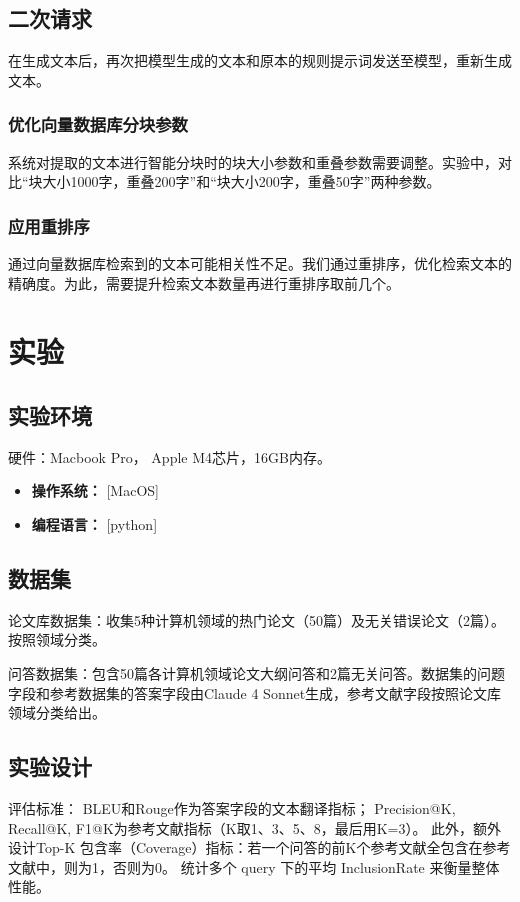 \documentclass[12pt,a4paper]{article}
\begin{document}
\subsection{二次请求}

在生成文本后，再次把模型生成的文本和原本的规则提示词发送至模型，重新生成文本。

\subsubsection{优化向量数据库分块参数}
系统对提取的文本进行智能分块时的块大小参数和重叠参数需要调整。实验中，对比“块大小1000字，重叠200字”和“块大小200字，重叠50字”两种参数。

\subsubsection{应用重排序}
通过向量数据库检索到的文本可能相关性不足。我们通过重排序，优化检索文本的精确度。为此，需要提升检索文本数量再进行重排序取前几个。

\section{实验}

\subsection{实验环境}
硬件：Macbook Pro， Apple M4芯片，16GB内存。

\begin{itemize}
    \item \textbf{操作系统：} [MacOS]
    \item \textbf{编程语言：} [python]
\end{itemize}

\subsection{数据集}
论文库数据集：收集5种计算机领域的热门论文（50篇）及无关错误论文（2篇）。按照领域分类。

问答数据集：包含50篇各计算机领域论文大纲问答和2篇无关问答。数据集的问题字段和参考数据集的答案字段由Claude 4 Sonnet生成，参考文献字段按照论文库领域分类给出。

\subsection{实验设计}

评估标准：
BLEU和Rouge作为答案字段的文本翻译指标；
Precision@K, Recall@K, F1@K为参考文献指标（K取1、3、5、8，最后用K=3）。
此外，额外设计Top-K 包含率（Coverage）指标：若一个问答的前K个参考文献全包含在参考文献中，则为1，否则为0。
统计多个 query 下的平均 InclusionRate 来衡量整体性能。
\end{document}
